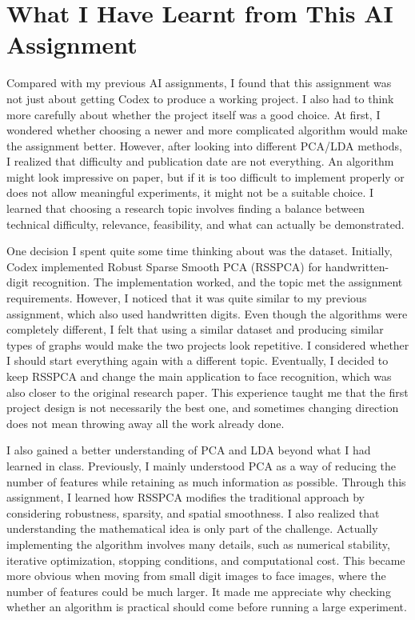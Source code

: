 \clearpage
\section{What I Have Learnt from This AI Assignment}

Compared with my previous AI assignments, I found that this assignment was not just about getting Codex to produce a working project. I also had to think more carefully about whether the project itself was a good choice. At first, I wondered whether choosing a newer and more complicated algorithm would make the assignment better. However, after looking into different PCA/LDA methods, I realized that difficulty and publication date are not everything. An algorithm might look impressive on paper, but if it is too difficult to implement properly or does not allow meaningful experiments, it might not be a suitable choice. I learned that choosing a research topic involves finding a balance between technical difficulty, relevance, feasibility, and what can actually be demonstrated.

One decision I spent quite some time thinking about was the dataset. Initially, Codex implemented Robust Sparse Smooth PCA (RSSPCA) for handwritten-digit recognition. The implementation worked, and the topic met the assignment requirements. However, I noticed that it was quite similar to my previous assignment, which also used handwritten digits. Even though the algorithms were completely different, I felt that using a similar dataset and producing similar types of graphs would make the two projects look repetitive. I considered whether I should start everything again with a different topic. Eventually, I decided to keep RSSPCA and change the main application to face recognition, which was also closer to the original research paper. This experience taught me that the first project design is not necessarily the best one, and sometimes changing direction does not mean throwing away all the work already done.

I also gained a better understanding of PCA and LDA beyond what I had learned in class. Previously, I mainly understood PCA as a way of reducing the number of features while retaining as much information as possible. Through this assignment, I learned how RSSPCA modifies the traditional approach by considering robustness, sparsity, and spatial smoothness. I also realized that understanding the mathematical idea is only part of the challenge. Actually implementing the algorithm involves many details, such as numerical stability, iterative optimization, stopping conditions, and computational cost. This became more obvious when moving from small digit images to face images, where the number of features could be much larger. It made me appreciate why checking whether an algorithm is practical should come before running a large experiment.

